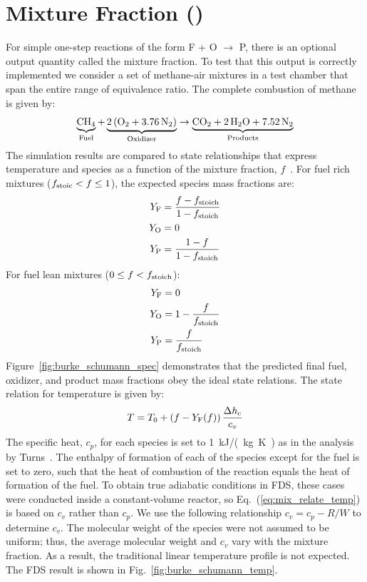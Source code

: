 \documentclass[11pt]{book}
\begin{document}
\section{Mixture Fraction ()}
\label{Mix_Frac}
\label{burke_schumann_spec}
\label{burke_schumann_temp}

For simple one-step reactions of the form F + O $\rightarrow$ P, there is an optional output quantity called the mixture fraction. To test that this output is correctly implemented we consider a set of methane-air mixtures in a test chamber that span the entire range of equivalence ratio. The complete combustion of methane is given by:
\begin{equation}\label{eq:methane_ex2}
\underbrace{\mathrm{CH_4}}_{\rm Fuel} + \underbrace{\mathrm{2\,(O_2 + 3.76\,N_2)}}_{\rm Oxidizer} \rightarrow  \underbrace{\mathrm{CO_2 + 2\, H_2O + 7.52\,N_2}}_{\rm Products}
\end{equation}
The simulation results are compared to state relationships that express temperature and species as a function of the mixture fraction, $f$~\cite{Turns:1996}. For fuel rich mixtures ($f_{\rm stoic} < f \le 1$), the expected species mass fractions are:
\begin{align}\label{eq:mix_relate_rich}
Y_{\rm F} &= \frac{f-f_{\rm stoich}}{1-f_{\rm stoich}} \\
Y_{\rm O} &= 0 \\
Y_{\rm P} &= \frac{1-f}{1-f_{\rm stoich}}
\end{align}
For fuel lean mixtures ($0 \le f < f_{\rm stoich}$):
\begin{align}\label{eq:mix_relate_lean}
Y_{\rm F} &= 0 \\
Y_{\rm O} &= 1- \frac{f}{f_{\rm stoich}} \\
Y_{\rm P} &= \frac{f}{f_{\rm stoich}}
\end{align}
Figure~\ref{fig:burke_schumann_spec} demonstrates that the predicted final fuel, oxidizer, and product mass fractions obey the ideal state relations. The state relation for temperature is given by:
\begin{equation}\label{eq:mix_relate_temp}
T = T_0 +  (f-Y_{\rm F}(f)) \, \frac{\Delta h_{\rm c}}{c_{v}}
\end{equation}
The specific heat, $c_p$, for each species is set to 1~\si{kJ/(kg.K)} as in the analysis by Turns~\cite{Turns:1996}. The enthalpy of formation of each of the species except for the fuel is set to zero, such that the heat of combustion of the reaction equals the heat of formation of the fuel. To obtain true adiabatic conditions in FDS, these cases were conducted inside a constant-volume reactor, so Eq.~(\ref{eq:mix_relate_temp}) is based on $c_v$ rather than $c_p$. We use the  following relationship $c_v = c_p - R/W$ to determine $c_v$. The molecular weight of the species were not assumed to be uniform; thus, the average molecular weight and $c_v$ vary with the mixture fraction. As a result, the traditional linear temperature profile is not expected.  The FDS result is shown in Fig.~\ref{fig:burke_schumann_temp}.
\end{document}
